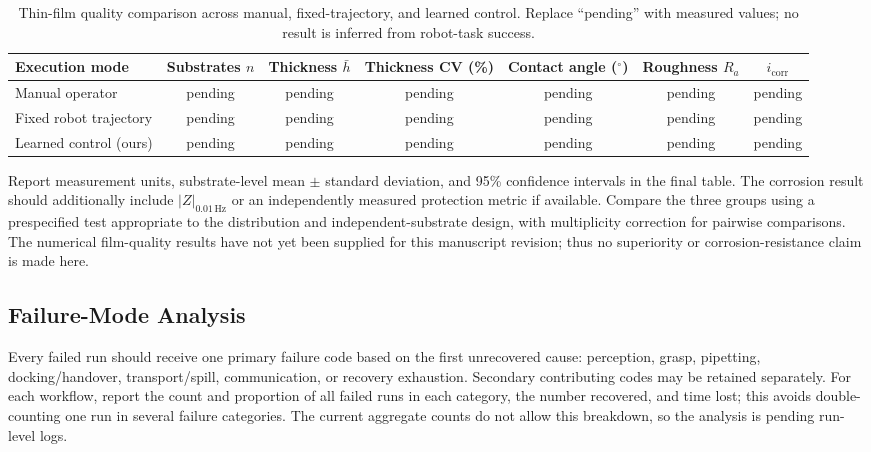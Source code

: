 \begin{table}[!t]
\renewcommand{\arraystretch}{1.2}
\caption{Thin-film quality comparison across manual, fixed-trajectory, and learned control. Replace ``pending'' with measured values; no result is inferred from robot-task success.}
\label{tab:film_quality}
\centering
\begin{tabular}{lcccccc}
\hline\hline
\textbf{Execution mode} & \textbf{Substrates $n$} & \textbf{Thickness $\bar h$} & \textbf{Thickness CV (\%)} & \textbf{Contact angle ($^\circ$)} & \textbf{Roughness $R_a$} & \textbf{$i_{\mathrm{corr}}$} \\ \hline
Manual operator & pending & pending & pending & pending & pending & pending \\
Fixed robot trajectory & pending & pending & pending & pending & pending & pending \\
Learned control (ours) & pending & pending & pending & pending & pending & pending \\ \hline\hline
\end{tabular}
\end{table}

Report measurement units, substrate-level mean $\pm$ standard deviation, and 95\% confidence intervals in the final table. The corrosion result should additionally include $|Z|_{0.01\,\mathrm{Hz}}$ or an independently measured protection metric if available. Compare the three groups using a prespecified test appropriate to the distribution and independent-substrate design, with multiplicity correction for pairwise comparisons. The numerical film-quality results have not yet been supplied for this manuscript revision; thus no superiority or corrosion-resistance claim is made here.

\subsection{Failure-Mode Analysis}
Every failed run should receive one primary failure code based on the first unrecovered cause: perception, grasp, pipetting, docking/handover, transport/spill, communication, or recovery exhaustion. Secondary contributing codes may be retained separately. For each workflow, report the count and proportion of all failed runs in each category, the number recovered, and time lost; this avoids double-counting one run in several failure categories. The current aggregate counts do not allow this breakdown, so the analysis is pending run-level logs.

